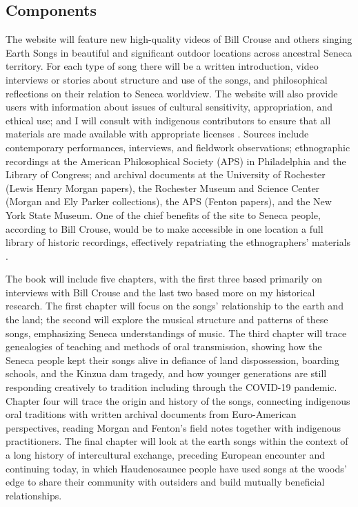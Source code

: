 \documentclass{neh}
\begin{document}
\subsection{Components}

The website will feature new high-quality videos of Bill Crouse and others
singing Earth Songs in beautiful and significant outdoor locations
across ancestral Seneca territory.
For each type of song there will be a written introduction, video interviews
or stories about structure and use of the songs, and philosophical reflections
on their relation to Seneca worldview.
The website will also provide users with information about issues of cultural
sensitivity, appropriation, and ethical use; and I will consult with
indigenous contributors to ensure that all materials are made available with
appropriate licenses
\Autocite{Christen:RelationshipsNotRecords}.
Sources include contemporary performances, interviews, and fieldwork
observations; ethnographic recordings at the American Philosophical Society
(APS) in Philadelphia and the Library of Congress; and archival
documents at the University of Rochester (Lewis Henry Morgan papers), the
Rochester Museum and Science Center (Morgan and Ely Parker collections), the
APS (Fenton papers), and the New York State Museum.
One of the chief benefits of the site to Seneca people, according to Bill
Crouse, would be to make accessible in one location a full library of
historic recordings, effectively repatriating the ethnographers' materials 
\Autocite{Fox:Repatriation}.

The book will include five chapters, with the first three based primarily on
interviews with Bill Crouse and the last two based more on my historical
research.
The first chapter will focus on the songs' relationship to the earth and the
land; the second will explore the musical structure and patterns of these
songs, emphasizing Seneca understandings of music.
The third chapter will trace genealogies of teaching and methods of oral
transmission, showing how the Seneca people kept their songs alive in defiance
of land dispossession, boarding schools, and the Kinzua dam tragedy, and how
younger generations are still responding creatively to tradition including
through the COVID-19 pandemic.
Chapter four will trace the origin and history of the songs, connecting
indigenous oral traditions with written archival documents from Euro-American
perspectives, reading Morgan and Fenton's field notes together with indigenous
practitioners.
The final chapter will look at the earth songs within the context of a long
history of intercultural exchange, preceding European encounter and continuing
today, in which Haudenosaunee people have used songs at the woods' edge to
share their community with outsiders and build mutually beneficial
relationships.
\end{document}
